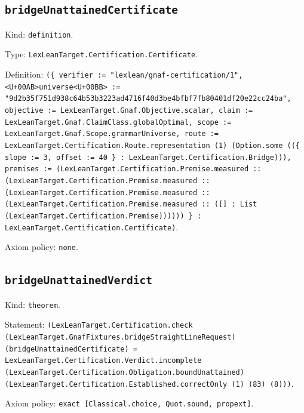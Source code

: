 \documentclass[11pt]{article}
\begin{document}
\subsection*{\texttt{bridgeUnattainedCertificate}}
\noindent Kind: \texttt{definition}.\par
\noindent Type: \texttt{LexLeanTarget.Certification.Certificate}.\par
\noindent Definition: \texttt{(\{ verifier := "lexlean/gnaf-certification/1", <U+00AB>universe<U+00BB> := "9d2b35f751d938c64b53b3223ad4716f40d3be4bfbf7fb80401df20e22cc24ba", objective := LexLeanTarget.Gnaf.Objective.scalar, claim := LexLeanTarget.Gnaf.ClaimClass.globalOptimal, scope := LexLeanTarget.Gnaf.Scope.grammarUniverse, route := LexLeanTarget.Certification.Route.representation (1) (Option.some ((\{ slope := 3, offset := 40 \} : LexLeanTarget.Certification.Bridge))), premises := (LexLeanTarget.Certification.Premise.measured :: (LexLeanTarget.Certification.Premise.measured :: (LexLeanTarget.Certification.Premise.measured :: (LexLeanTarget.Certification.Premise.measured :: ([] : List (LexLeanTarget.Certification.Premise)))))) \} : LexLeanTarget.Certification.Certificate)}.\par
\noindent Axiom policy: \texttt{none}.\par
\subsection*{\texttt{bridgeUnattainedVerdict}}
\noindent Kind: \texttt{theorem}.\par
\noindent Statement: \texttt{(LexLeanTarget.Certification.check (LexLeanTarget.GnafFixtures.bridgeStraightLineRequest) (bridgeUnattainedCertificate) = LexLeanTarget.Certification.Verdict.incomplete (LexLeanTarget.Certification.Obligation.boundUnattained) (LexLeanTarget.Certification.Established.correctOnly (1) (83) (8)))}.\par
\noindent Axiom policy: \texttt{exact [Classical.choice, Quot.sound, propext]}.\par
\end{document}
